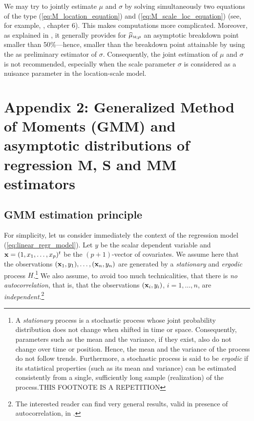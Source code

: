 \begin{stremark}
We may try to jointly estimate $\mu$ and $\sigma$ by solving simultaneously two
equations of the type (\ref{eq:M_location_equation}) and
(\ref{eq:M_scale_loc_equation}) (see, for example, \citealp{Huber:2009},
chapter 6). This makes computations more complicated. Moreover, as explained in
\cite{maronna:etal:2006}, it generally provides for
$\sthat{\mu}_{\stsc{M};\rho}$ an asymptotic breakdown point smaller than
50\%---hence, smaller than the breakdown point attainable by using the
 as preliminary estimator of $\sigma$. Consequently, the joint
estimation of $\mu$ and $\sigma$ is not recommended, especially when the scale
parameter $\sigma$ is considered as a nuisance parameter in the location-scale
model.
\end{stremark}

\section{Appendix 2: Generalized Method of Moments (GMM) and asymptotic distributions of regression M, S and MM estimators}
\label{sec:robreg:appendix2}

\subsection{GMM estimation principle}

For simplicity, let us consider immediately the context of the regression model
(\ref{eq:linear_regr_model}). Let $y$ be the scalar dependent variable and
$\mathbf x = (1, x_1, \dots, x_p)^t$ be the $(p+1)$-vector of covariates. We
assume here that the observations $(\mathbf x_1, y_1), \dots, (\mathbf x_n,
y_n)$ are generated by a \emph{stationary} and \emph{ergodic} process
$H$.\footnote{A \emph{stationary} process is a stochastic process whose joint
probability distribution does not change when shifted in time or space.
Consequently, parameters such as the mean and the variance, if they exist, also
do not change over time or position. Hence, the mean and the variance of the
process do not follow trends. Furthermore, a stochastic process is said to be
\emph{ergodic} if its statistical properties (such as its mean and variance)
can be estimated consistently from a single, sufficiently long sample
(realization) of the process.\alert{THIS FOOTNOTE IS A REPETITION}} We also
assume, to avoid too much technicalities, that there is \emph{no
autocorrelation}, that is, that the observations $(\mathbf x_i, y_i)$, $i = 1,
\dots, n$, are \emph{independent}.\footnote{The interested reader can find very
general results, valid in presence of autocorrelation, in \cite{Croux:2003}.}

